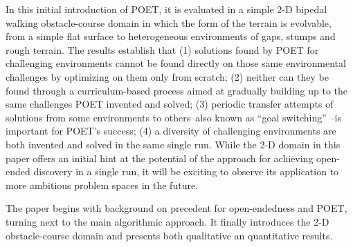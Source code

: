 \documentclass{article}
\newcommand{\jc}[1]{\comments{\textcolor{deepForestGreen}{[JC: #1]}}}
\newcommand{\jl}[1]{\comments{\textcolor{magenta}{[Joel: #1]}}}
\newcommand{\ks}[1]{\comments{\textcolor{purple}{[Ken: #1]}}}
\newcommand{\comments}[1]{#1}
\begin{document}
In this initial
introduction of POET, it is evaluated in a simple 2-D bipedal walking obstacle-course domain in which the form of the terrain is evolvable, from a simple flat surface to heterogeneous environments of gaps, stumps and rough terrain.  The results establish that (1) solutions found by POET for challenging environments cannot be found directly on those same environmental challenges by optimizing on them only from scratch; 
(2) neither can they be found through a curriculum-based process aimed at gradually building up to the same challenges POET invented and solved;
(3) periodic transfer attempts of solutions from some environments to others--also known as ``goal switching'' \cite{nguyen2016innovative}--is important for POET's success; (4) a diversity of challenging environments are both invented and solved in the same single run.
While the 2-D domain in this paper offers an initial hint at the potential of the approach for achieving open-ended discovery in a single run, it will be exciting to observe its application to more ambitious problem spaces in the future.  

The paper begins with background on precedent for open-endedness and POET, turning next to the main algorithmic approach.  It finally introduces the 2-D obstacle-course domain and presents both qualitative an quantitative results.
\end{document}
